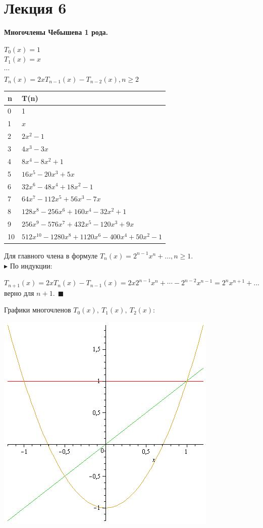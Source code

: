 \documentclass[12pt]{article}
\theoremstyle{definition}
\numberwithin{equation}{section}
\begin{document}
	\section *{Лекция 6}
	\noindent \textbf{Многочлены Чебышева 1 рода.}
	\begin{center}
		$T_0(x) = 1$ \\
		$T_1(x) = x$\\
		$\cdots$\\
		$T_n(x) = 2xT_{n-1}(x)-T_{n-2}(x), n\geqslant 2$
	\end{center} 
	\begin{center}
		\begin{tabular}{|l|l|}
			\hline
			\textbf{n} & \textbf{T(n)} \\ \hline
			0 & 1 \\ \hline
			1 & $x$ \\ \hline
			2 & $2x^2-1$ \\ \hline
			3 & $4x^3-3x$ \\ \hline
			4 & $8x^4-8x^2+1$ \\ \hline
			5 & $16x^5-20x^3+5x$ \\ \hline
			6 & $32x^6-48x^4+18x^2-1$ \\ \hline
			7 & $64x^7-112x^5+56x^3-7x$ \\ \hline
			8 & $128x^8-256x^6+160x^4-32x^2+1$ \\ \hline
			9 & $256x^9-576x^7+432x^5-120x^3+9x$ \\ \hline
			10 & $512x^{10}-1280x^8+1120x^6-400x^4+50x^2-1$ \\ \hline
		\end{tabular}
	\end{center}
	Для главного члена в формуле $T_n(x)=2^{n-1}x^n+..., n\geqslant 1$.\\
	$\blacktriangleright$ По индукции:\begin{center}
		$T_{n+1}(x)=2xT_n(x)-T_{n-1}(x)=2x2^{n-1}x^n+\cdots-2^{n-2}x^{n-1}=2^nx^{n+1}+...$ верно для $n+1. ~~\blacksquare$\end{center}
	Графики многочленов $T_0(x),~ T_1(x),~ T_2(x)$:\begin{center}
		\includegraphics[scale=0.5]{T0T1T2.jpg} \end{center}
\end{document}
